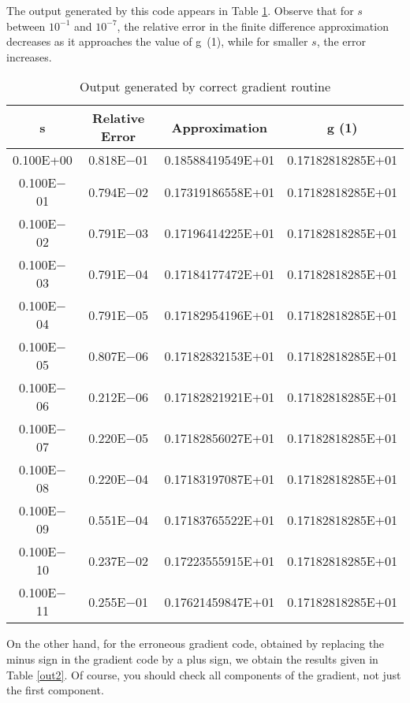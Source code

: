 \documentclass [12pt] {article}
\begin{document}
The output generated by this code appears in Table \ref{out1}.
Observe that for $s$ between $10^{-1}$ and $10^{-7}$, the relative
error in the finite difference approximation decreases as it approaches
the value of g~(1), while for smaller $s$, the error increases.
\begin{table}
\begin{center}
\begin{tabular}{cccc}
{\sc s} & Relative Error & Approximation & {\sc g} (1)\\
\hline
0.100E+00 & 0.818E$-$01 & 0.18588419549E+01 & 0.17182818285E+01 \\
0.100E$-$01 & 0.794E$-$02 & 0.17319186558E+01 & 0.17182818285E+01 \\
0.100E$-$02 & 0.791E$-$03 & 0.17196414225E+01 & 0.17182818285E+01 \\
0.100E$-$03 & 0.791E$-$04 & 0.17184177472E+01 & 0.17182818285E+01 \\
0.100E$-$04 & 0.791E$-$05 & 0.17182954196E+01 & 0.17182818285E+01 \\
0.100E$-$05 & 0.807E$-$06 & 0.17182832153E+01 & 0.17182818285E+01 \\
0.100E$-$06 & 0.212E$-$06 & 0.17182821921E+01 & 0.17182818285E+01 \\
0.100E$-$07 & 0.220E$-$05 & 0.17182856027E+01 & 0.17182818285E+01 \\
0.100E$-$08 & 0.220E$-$04 & 0.17183197087E+01 & 0.17182818285E+01 \\
0.100E$-$09 & 0.551E$-$04 & 0.17183765522E+01 & 0.17182818285E+01 \\
0.100E$-$10 & 0.237E$-$02 & 0.17223555915E+01 & 0.17182818285E+01 \\
0.100E$-$11 & 0.255E$-$01 & 0.17621459847E+01 & 0.17182818285E+01 \\
\hline
\end{tabular}
\end{center}
\caption{Output generated by correct gradient routine}
\label{out1}
\end{table}
On the other hand, for the erroneous gradient code,
obtained by replacing the minus sign in the gradient code by a plus sign,
we obtain the results given in Table \ref{out2}.
Of course, you should check all components of the gradient,
not just the first component.
\end{document}
